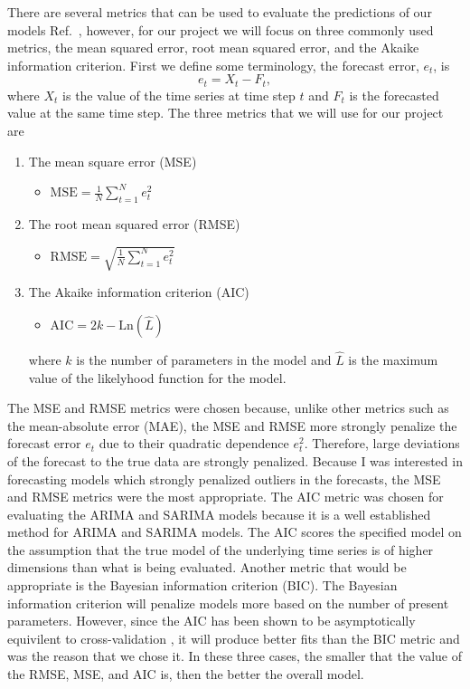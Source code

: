 \documentclass[10pt,a4paper]{article}
\begin{document}
There are several metrics that can be used to evaluate the predictions of our models Ref.~\cite{Adhikari_2013}, however, for our project we will focus on three commonly used metrics, the mean squared error, root mean squared error, and the Akaike information criterion. First we define some terminology, the forecast error, $e_t$, is
\begin{equation}
e_{t} = X_t - F_t,
\end{equation}
where $X_t$ is the value of the time series at time step $t$ and $F_t$ is the forecasted value at the same time step. The three metrics that we will use for our project are
\begin{enumerate}

\item  The mean square error (MSE)
\begin{itemize}
\item $\text{MSE} = \frac{1}{N}\sum\limits_{t=1}^{N} e^2_{t} $
\end{itemize}

\item  The root mean squared error (RMSE)
\begin{itemize}
\item $\text{RMSE} = \sqrt{\frac{1}{N}\sum\limits_{t=1}^{N} e^2_{t}} $
\end{itemize}

\item The Akaike information criterion (AIC)
\begin{itemize}
\item $\text{AIC} = 2k - \text{Ln}(\hat{L})$
\end{itemize}
where $k$ is the number of parameters in the model and $\hat{L}$ is the maximum value of the likelyhood function for the model.

\end{enumerate}
\noindent
The MSE and RMSE metrics were chosen because, unlike other metrics such as the mean-absolute error (MAE), the MSE and RMSE more strongly penalize the forecast error $e_t$ due to their quadratic dependence $e^2_t$. Therefore, large deviations of the forecast to the true data are strongly penalized. Because I was interested in forecasting models which strongly penalized outliers in the forecasts, the MSE and RMSE metrics were the most appropriate. The AIC metric was chosen for evaluating the ARIMA and SARIMA models because it is a well established method for ARIMA and SARIMA models. The AIC scores the specified model on the assumption that the true model of the underlying time series is of higher dimensions than what is being evaluated. Another metric that would be appropriate is the Bayesian information criterion (BIC). The Bayesian information criterion will penalize models more based on the number of present parameters. However, since the AIC has been shown to be asymptotically equivilent to cross-validation \cite{Stone_1977}, it will produce better fits than the BIC metric and was the reason that we chose it. In these three cases, the smaller that the value of the RMSE, MSE, and AIC is, then the better the overall model.
\end{document}
